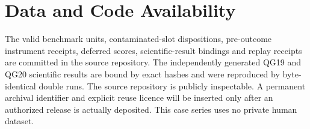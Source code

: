 \documentclass[10pt]{article}
\begin{document}
\section*{Data and Code Availability}
The valid benchmark units, contaminated-slot dispositions, pre-outcome instrument receipts,
deferred scores, scientific-result bindings and replay receipts are committed in the source
repository. The independently generated QG19 and QG20 scientific results are bound by exact
hashes and were reproduced by byte-identical double runs. The source repository is publicly
inspectable. A permanent archival identifier and explicit reuse licence will be inserted only
after an authorized release is actually deposited. This case series uses no private human dataset.



\end{document}
